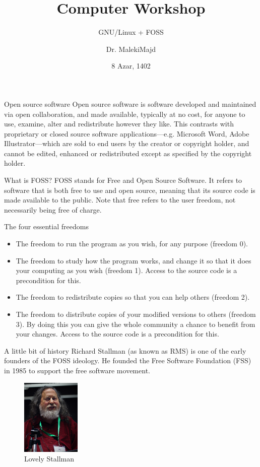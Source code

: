 \documentclass{beamer}
\title{Computer Workshop}
\subtitle{GNU/Linux + FOSS}
\author{Dr. MalekiMajd}
\institute[IUST]{Iran University Of Science And Technology}
\date{8 Azar, 1402}
\begin{document}
\frame{\titlepage}

\begin{frame}{Open source software}
	Open source software is software developed and maintained via open collaboration, and made available, 
	typically at no cost, for anyone to use, examine, alter and redistribute however they like. This contrasts 
	with proprietary or closed source software applications—e.g. Microsoft Word, Adobe Illustrator—which are
	sold to end users by the creator or copyright holder, and cannot be edited, enhanced or redistributed except 
	as specified by the copyright holder.
\end{frame}

\begin{frame}{What is FOSS?}
	FOSS stands for Free and Open Source Software. It refers to software that is both free to use and open source, 
	meaning that its source code is made available to the public. Note that free refers to the user freedom, not
	necessarily being free of charge.
\end{frame}

\begin{frame}{The four essential freedoms}
	\begin{itemize}
		\item The freedom to run the program as you wish, for any purpose (freedom 0).
		\item The freedom to study how the program works, and change it so that it does your computing as you wish 
			(freedom 1). Access to the source code is a precondition for this.
		\item The freedom to redistribute copies so that you can help others (freedom 2).
		\item The freedom to distribute copies of your modified versions to others (freedom 3). 
			By doing this you can give the whole community a chance to benefit from your changes. 
			Access to the source code is a precondition for this.
	\end{itemize}
\end{frame}

\begin{frame}{A little bit of history}
	Richard Stallman (as known as RMS) is one of the early founders of the FOSS ideology.
	He founded the Free Software Foundation (FSS) in 1985 to support the free software movement.
	\begin{figure}
		\begin{center}
			\includegraphics[width=0.25\textwidth]{images/rms.jpg}
		\end{center}
		\caption{Lovely Stallman}
	\end{figure}
\end{frame}
\end{document}
